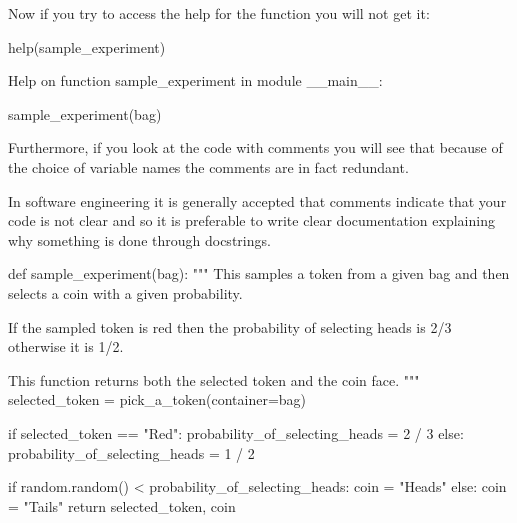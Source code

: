 Now if you try to access the help for the function you will not get it:




\begin{pyin}
help(sample_experiment)
\end{pyin}





\begin{raw}
Help on function sample_experiment in module __main__:

sample_experiment(bag)
\end{raw}


Furthermore, if you look at the code with comments you will see that because of
the choice of variable names the comments are in fact redundant.

In software engineering it is generally accepted that comments indicate that
your code is not clear and so it is preferable to write clear documentation
explaining why something is done through docstrings.




\begin{pyin}
def sample_experiment(bag):
    """
    This samples a token from a given bag and then
    selects a coin with a given probability.

    If the sampled token is red then the probability
    of selecting heads is 2/3 otherwise it is 1/2.

    This function returns both the selected token
    and the coin face.
    """
    selected_token = pick_a_token(container=bag)

    if selected_token == "Red":
        probability_of_selecting_heads = 2 / 3
    else:
        probability_of_selecting_heads = 1 / 2

    if random.random() < probability_of_selecting_heads:
        coin = "Heads"
    else:
        coin = "Tails"
    return selected_token, coin
\end{pyin}
